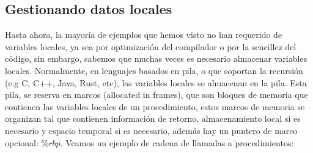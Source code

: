 \subsection{Gestionando datos locales}
Hasta ahora, la mayoría de ejemplos que hemos visto no han requerido de variables locales, ya sea por optimización del compilador o por la sencillez del código,
sin embargo, sabemos que muchas veces es necesario almacenar variables locales.
Normalmente, en lenguajes basados en pila, o que soportan la recursión (e.g C, C++, Java, Rust, etc), las variables locales se almacenan en la pila.
Esta pila, se reserva en marcos (allocated in frames), que son bloques de memoria que contienen las variables locales de un procedimiento, estos marcos de memoria
se organizan tal que contienen información de retorno, almacenamiento local si es necesario y espacio temporal si es necesario, además hay un puntero de marco opcional:
$\%rbp$. Veamos un ejemplo de cadena de llamadas a procedimientos:
%
%
%
%
%
